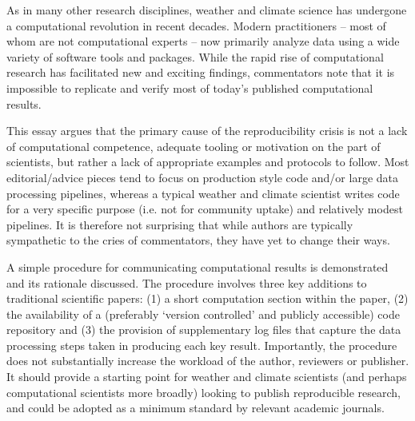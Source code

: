 As in many other research disciplines, weather and climate science has undergone a computational revolution in recent decades. Modern practitioners – most of whom are not computational experts – now primarily analyze data using a wide variety of software tools and packages. While the rapid rise of computational research has facilitated new and exciting findings, commentators note that it is impossible to replicate and verify most of today's published computational results.

This essay argues that the primary cause of the reproducibility crisis is not a lack of computational competence, adequate tooling or motivation on the part of scientists, but rather a lack of appropriate examples and protocols to follow. Most editorial/advice pieces tend to focus on production style code and/or large data processing pipelines, whereas a typical weather and climate scientist writes code for a very specific purpose (i.e. not for community uptake) and relatively modest pipelines. It is therefore not surprising that while authors are typically sympathetic to the cries of commentators, they have yet to change their ways.

A simple procedure for communicating computational results is demonstrated and its rationale discussed. The procedure involves three key additions to traditional scientific papers: (1) a short computation section within the paper, (2) the availability of a (preferably `version controlled' and publicly accessible) code repository and (3) the provision of supplementary log files that capture the data processing steps taken in producing each key result. Importantly, the procedure does not substantially increase the workload of the author, reviewers or publisher. It should provide a starting point for weather and climate scientists (and perhaps computational scientists more broadly) looking to publish reproducible research, and could be adopted as a minimum standard by relevant academic journals.